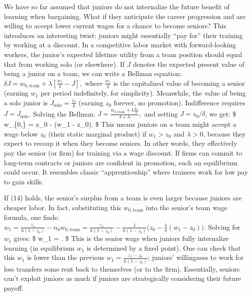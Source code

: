 \documentclass[12pt]{article}
\begin{document}
We have so far assumed that juniors {do not internalize} the future
benefit of learning when bargaining. What if they {anticipate the
career progression} and are willing to accept lower current wages for a
chance to become seniors? This introduces an interesting twist: juniors
might essentially ``pay for'' their training by working at a discount.
In a competitive labor market with forward-looking workers, the junior's
expected lifetime utility from a team position should equal that from
working solo (or elsewhere). If \(J\) denotes the expected {present
value} of being a junior on a team, we can write a {Bellman
equation}:
\(\delta J = w_{0,\text{team}} + \lambda [\frac{w_1}{\delta} - J],\)
where \(\frac{w_1}{\delta}\) is the capitalized value of becoming a
senior (earning \(w_1\) per period indefinitely, for simplicity).
Meanwhile, the value of being a solo junior is
\(J_{\text{solo}} = \frac{z_0}{\delta}\) (earning \(z_0\) forever, no
promotion). Indifference requires \(J = J_{\text{solo}}\). Solving the
Bellman:
\(J = \frac{w_{0,\text{team}} + \lambda \frac{w_1}{\delta}}{\delta + \lambda},\)
and setting \(J = z_0/\delta\), we get: \$ w\_\{0,\} = z\_0 -
\frac{\lambda}{\delta}(w\_1 - z\_0). \$ This means juniors on a
team might accept a wage {below} \(z_0\) (their static marginal
product) if \(w_1 > z_0\) and \(\lambda>0\), because they expect to
recoup it when they become seniors. In other words, they effectively pay
the senior (or firm) for training via a wage discount. If firms can
commit to long-term contracts or juniors are confident in promotion,
such an equilibrium could occur. It resembles classic ``apprenticeship''
where trainees work for low pay to gain skills.

If (14) holds, the senior's surplus from a team is even larger because
juniors are cheaper labor. In fact, substituting this
\(w_{0,\text{team}}\) into the senior's team wage formula, one finds:
\(w_1 = \frac{z_1}{h(1-z_0)} - n_0 w_{0,\text{team}} = \frac{z_1}{h(1-z_0)} - \frac{1}{h(1-z_0)}\Big(z_0 - \frac{\lambda}{\delta}(w_1 - z_0)\Big).\)
Solving for \(w_1\) gives: \$ w\_1 =
.
\$ This is the senior wage when juniors fully internalize
learning (in equilibrium \(w_1\) is determined by a fixed point). One
can check that this \(w_1\) is lower than the previous
\(w_1 = \frac{z_1 - z_0}{h(1-z_0)}\); juniors' willingness to work for
less transfers some rent back to themselves (or to the firm).
Essentially, seniors can't exploit juniors as much if juniors are
strategically considering their future payoff.
\end{document}
